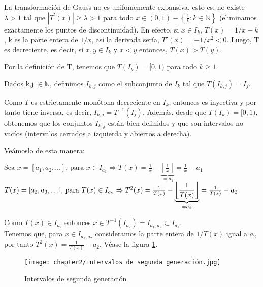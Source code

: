 \begin{obs}
La transformación de Gauss no es unifomemente expansiva, esto es, no existe $\lambda>1$ tal que $|T^{\prime}(x)|\geq\lambda>1$ para todo $x \in(0,1) - \left\{\frac{1}{k} : k\in\mathbb{N}\right\}$ (eliminamos exactamente los puntos de discontinuidad). En efecto, si $x\in I_{k}$, $T(x)=1/x - k$, k es la parte entera de $1/x$, así la derivada sería, $T'(x)= -1/x^2 < 0$. Luego, T es decreciente, es decir, si $x,y \in I_{k}$ y $x<y$ entonces, $T(x)>T(y)$.
\end{obs} 

\begin{obs}
Por la definición de T, tenemos que $T(I_{k})=[0,1)$ para todo $k\geq1$.
\end{obs}
\begin{defi}
Dados k,j $\in\mathbb{N}$, definimos $I_{k,j}$ como el subconjunto de $I_{k}$ tal que
$
T(I_{k,j})=I_{j} .
$
\label{defi3-2}
\end{defi} 
\begin{obs}
Como $T$ es estrictamente monótona decreciente en $I_{k}$, entonces es inyectiva y por tanto tiene inversa, es decir, $I_{k,j}=T^{-1}(I_{j})$. Además, desde que $T(I_{k})=[0,1)$, obtenemos que los conjuntos $I_{k,j}$ están bien definidos y que son intervalos no vacíos (intervalos cerrados a izquierda y abiertos a derecha).
\end{obs}
Veámoslo de esta manera:


$
\text{Sea } x=[a_{1},a_{2},\ldots] \text{, para } x \in I_{a_{1}} \Rightarrow T(x)=\frac{1}{x}-\underbrace{\left\lfloor\frac{1}{x}\right\rfloor}_{=a_{1}}=\frac{1}{x}-a_{1}
$ \\

$
T(x)=[a_{2},a_{3},\ldots] \text{, para } T(x) \in I_{a_{2}}\Rightarrow T^{2}(x)=\frac{1}{T(x)}-\underbrace{\left\lfloor\frac{1}{T(x)}\right\rfloor}_{=a_{2}}=\frac{1}{T(x)}-a_{2} \\
$

Como $T(x) \in I_{a_{2}}$ entonces $x\in T^{-1}(I_{a_{2}})=I_{a_{1},a_{2}}\subset I_{a_{1}}$.
\\

Tenemos que, para $x\in I_{a_{1},a_{2}}$ consideramos la parte entera de $1/T(x)$ igual a $a_{2}$  por tanto $T^{2}(x)=\frac{1}{T(x)}-a_{2}$.
Véase la figura \ref{TG2}.

\begin{figure}[h]
    \centering
    \texttt{[image: chapter2/intervalos de segunda generación.jpg]}
    \caption{Intervalos de segunda generación}
    \label{TG2}
\end{figure}

